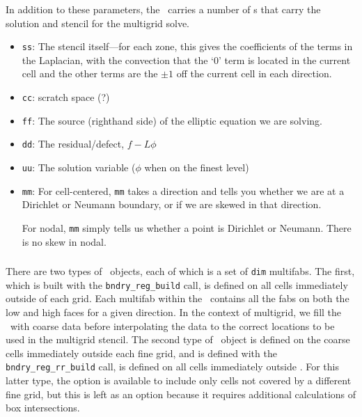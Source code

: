 In addition to these parameters, the \mgtower\ carries a number of
\multifab s that carry the solution and stencil for the multigrid
solve.

\begin{itemize}

\item {\tt ss}: The stencil itself---for each zone, this gives the 
  coefficients of the terms in the Laplacian, with the convection that
  the `0' term is located in the current cell and the other terms are
  the $\pm 1$ off the current cell in each direction.

\item {\tt cc}: scratch space (?)

\item {\tt ff}: The source (righthand side) of the elliptic equation
  we are solving.

\item {\tt dd}: The residual/defect, $f - L\phi$

\item {\tt uu}: The solution variable ($\phi$ when on the finest level)

\item {\tt mm}: For cell-centered, {\tt mm} takes a direction and
   tells you whether we are at a Dirichlet or Neumann boundary, or if 
   we are skewed in that direction.

   For nodal, {\tt mm} simply tells us whether a point is Dirichlet
   or Neumann.  There is no skew in nodal.

\end{itemize}


\subsubsection{\bndryreg}

There are two types of \bndryreg\ objects, each of which is a set of 
{\tt dim} multifabs.  The first, which is built with 
the {\tt bndry\_reg\_build} call, is defined on all cells immediately outside
of each grid.  Each multifab within the \bndryreg\ contains all the fabs on both
the low and high faces for a given direction.  In the context of 
multigrid, we fill the \bndryreg\ with coarse data before interpolating the data
to the correct locations to be used in the multigrid stencil.  The second type
of \bndryreg\ object is defined on the coarse cells immediately outside each
fine grid, and is defined with the  {\tt bndry\_reg\_rr\_build} call, is defined on all cells immediately outside
.  For this latter type, the option is available to include only cells 
not covered by a different fine grid, but this is left as an option because it
requires additional calculations of box intersections.

